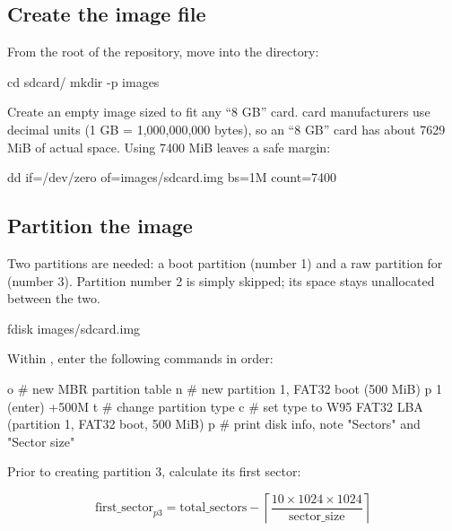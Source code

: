\subsection{Create the image file}
\label{subsec:fpgasteel-create-image}

From the root of the repository, move into the  directory:

\begin{shellcodehost}
cd sdcard/
mkdir -p images
\end{shellcodehost}

Create an empty image sized to fit any ``8 GB''  card.  card manufacturers use decimal units (1 GB = 1{,}000{,}000{,}000 bytes), so an ``8 GB'' card has about 7629 MiB of actual space. Using 7400 MiB leaves a safe margin:

\begin{shellcodehost}
dd if=/dev/zero of=images/sdcard.img bs=1M count=7400
\end{shellcodehost}

\subsection{Partition the image}
\label{subsec:fpgasteel-partition-image}

Two partitions are needed: a  boot partition (number 1) and a raw  partition for  (number 3). Partition number 2 is simply skipped; its space stays unallocated between the two.

\begin{shellcodehost}
fdisk images/sdcard.img
\end{shellcodehost}

Within , enter the following commands in order:

\begin{shellcodehost}
o       # new MBR partition table
n       # new partition 1, FAT32 boot (500 MiB)
p
1
(enter)
+500M
t       # change partition type
c       # set type to W95 FAT32 LBA (partition 1, FAT32 boot, 500 MiB)
p       # print disk info, note "Sectors" and "Sector size"
\end{shellcodehost}

Prior to creating partition 3, calculate its first sector:

\[
\text{first\_sector}_{p3} = \text{total\_sectors} - \left\lceil \frac{10 \times 1024 \times 1024}{\text{sector\_size}} \right\rceil
\]

